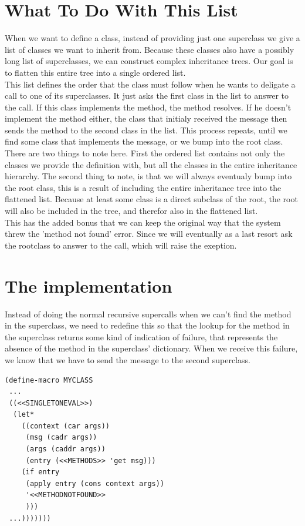 \documentclass[10pt,a4paper]{scrartcl}
\begin{document}
\begin{multicols}{2}
\section*{What To Do With This List}
When we want to define a class, instead of providing just one superclass we give a list of classes we want to inherit from. Because these classes also have a possibly long list of superclasses, we can construct complex inheritance trees. Our goal is to flatten this entire tree into a single ordered list.\\
This list defines the order that the class must follow when he wants to deligate a call to one of its superclasses. It just asks the first class in the list to answer to the call. If this class implements the method, the method resolves. If he doesn't implement the method either, the class that initialy received the message then sends the method to the second class in the list. This process repeats, until we find some class that implements the message, or we bump into the root class.\\
There are two things to note here. First the ordered list contains not only the classes we provide the definition with, but all the classes in the entire inheritance hierarchy. The second thing to note, is that we will always eventualy bump into the root class, this is a result of including the entire inheritance tree into the flattened list. Because at least some class is a direct subclass of the root, the root will also be included in the tree, and therefor also in the flattened list.\\
This has the added bonus that we can keep the original way that the system threw the 'method not found' error. Since we will eventually as a last resort ask the rootclass to answer to the call, which will raise the exeption.\\
\section*{The implementation}
Instead of doing the normal recursive supercalls when we can't find the method in the superclass, we need to redefine this so that the lookup for the method in the superclass returns some kind of indication of failure, that represents the absence of the method in the superclass' dictionary. When we receive this failure, we know that we have to send the message to the second superclass. 
\begin{lstlisting}
(define-macro MYCLASS
 ...
 ((<<SINGLETONEVAL>>)
  (let*
    ((context (car args))
     (msg (cadr args))
     (args (caddr args))
     (entry (<<METHODS>> 'get msg)))
    (if entry
     (apply entry (cons context args))
     '<<METHODNOTFOUND>>
     )))
 ...)))))))
\end{lstlisting}


\end{multicols}
\end{document}

